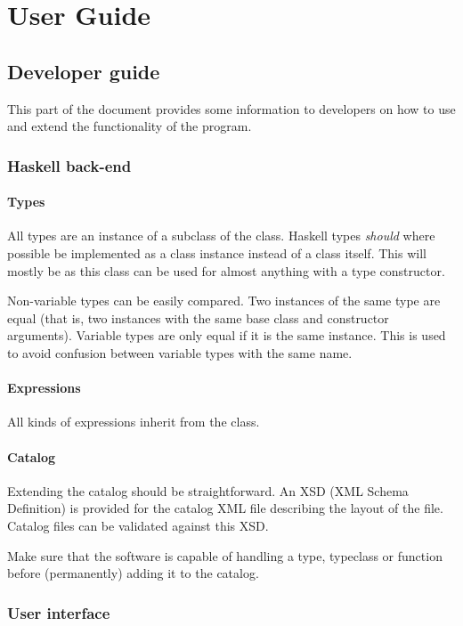 \chapter{User Guide}
\label{chap:Guide}

\section{Developer guide}

This part of the document provides some information to developers on how to use and extend the functionality of the program.

\subsection{Haskell back-end}

\subsubsection{Types}

All types are an instance of a subclass of the  class. Haskell types \emph{should} where possible be implemented as a class instance instead of a class itself.
This will mostly be  as this class can be used for almost anything with a type constructor.

Non-variable types can be easily compared. Two instances of the same type are equal (that is, two instances with the same base class and constructor arguments).
Variable types are only equal if it is the same instance. This is used to avoid confusion between variable types with the same name.

\subsubsection{Expressions}

All kinds of expressions inherit from the  class.

\subsubsection{Catalog}

Extending the catalog should be straightforward.
An XSD (XML Schema Definition) is provided for the catalog XML file describing the layout of the file. Catalog files can be validated against this XSD.

Make sure that the software is capable of handling a type, typeclass or function before (permanently) adding it to the catalog.

\subsection{User interface}
